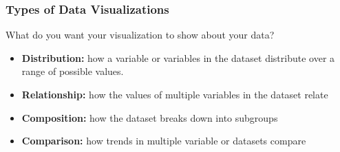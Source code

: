 \documentclass[12pt,t]{beamer}
\begin{document}
\begin{frame}
\begin{itemize}
  
  \end{itemize}
\end{frame}

\begin{frame}
  \frametitle{Types of Data Visualizations}
  What do you want your visualization to show about your data?
  \vskip0.2cm
  \begin{itemize}
  \item   \textbf{Distribution:} how a variable or variables in the dataset distribute over a range of possible values.
  \item   \textbf{Relationship:} how the values of multiple variables in the dataset relate
  \item   \textbf{Composition:} how the dataset breaks down into subgroups
  \item   \textbf{Comparison:} how trends in multiple variable or datasets compare
  \end{itemize}
  \end{frame}
\end{document}
